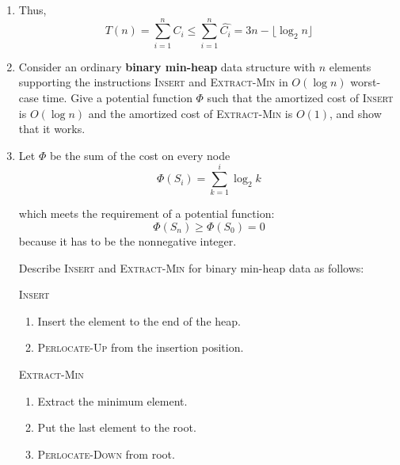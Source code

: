 \documentclass[12pt,a4paper]{article}
\makeatletter
\newtheorem*{solution}{Solution}
\theoremstyle{definition}
\renewenvironment{solution}[1][Solution] {\par\pushQED{\qed}\normalfont\topsep6\p@\@plus6\p@\relax\trivlist\item[\hskip\labelsep\bfseries#1\@addpunct{.}]\ignorespaces}{\popQED\endtrivlist\@endpefalse} \makeatother
\makeatother
\begin{document}
\begin{enumerate}
\begin{solution}
\begin{description}
		\end{description}

		\begin{figure}[h]
			\centering
			
		\end{figure}
	
		Thus,
		\begin{equation*}
			T(n) = \sum_{i=1}^n C_i \leq \sum_{i=1}^n \hat{C_i} = 3n - \lfloor \log_2 n \rfloor
		\end{equation*}
	\end{solution}

	\item Consider an ordinary \textbf{binary min-heap} data structure with $n$ elements supporting the instructions \textsc{Insert} and \textsc{Extract-Min} in $O(\log n)$ worst-case time. Give a potential function $\Phi$ such that the amortized cost of \textsc{Insert} is $O(\log n)$ and the amortized cost of \textsc{Extract-Min} is $O(1)$, and show that it works.
	
	
	\begin{solution}
		Let $\Phi$ be the sum of the cost on every node
		\begin{equation*}
			\Phi(S_i) = \sum_{k=1}^i \log_2 k
		\end{equation*}
		
		which meets the requirement of a potential function:
		\begin{equation*}
			\Phi(S_n) \geq \Phi(S_0) = 0
		\end{equation*}
		because it has to be the nonnegative integer.

		Describe \textsc{Insert} and \textsc{Extract-Min} for binary min-heap data as follows:
		\begin{multicols}{2}
			\textsc{Insert}
			\begin{enumerate}
				\item Insert the element to the end of the heap.
				\item \textsc{Perlocate-Up} from the insertion position.
			\end{enumerate}

			
			\textsc{Extract-Min}
			\begin{enumerate}
				\item Extract the minimum element.
				\item Put the last element to the root.
				\item \textsc{Perlocate-Down} from root.
			\end{enumerate}
		\end{multicols}
		

\end{solution}
\end{enumerate}
\end{document}
